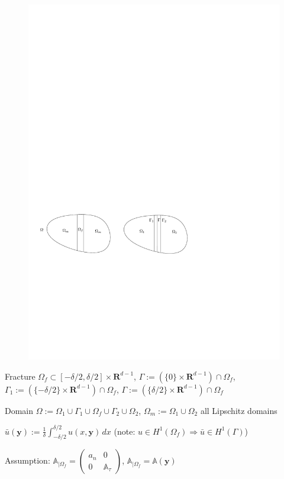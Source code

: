 \documentclass[a4paper]{article}
\def\vc#1{\mathbf{\boldsymbol{#1}}}     %
\def\tn#1{{\mathbb{#1}}}    %
\def\Real{{\mathbf R}}
\begin{document}
\begin{figure}[h]
\centering
\includegraphics[width=12cm]{figures/domains}
\end{figure}

Fracture $\Omega_f\subset[-\delta/2,\delta/2]\times\Real^{d-1}$, $\Gamma:=(\{0\}\times\Real^{d-1})\cap\Omega_f$, $\Gamma_1:=(\{-\delta/2\}\times\Real^{d-1})\cap\Omega_f$, $\Gamma:=(\{\delta/2\}\times\Real^{d-1})\cap\Omega_f$

Domain $\Omega:=\Omega_1\cup\Gamma_1\cup\Omega_f\cup\Gamma_2\cup\Omega_2$, $\Omega_m:=\Omega_1\cup\Omega_2$ all Lipschitz domains

$\bar u(\vc y) := \frac1\delta\int_{-\delta/2}^{\delta/2}u(x,\vc y)\,dx$
(note: $u\in H^1(\Omega_f)\Rightarrow\bar u\in H^1(\Gamma)$)

Assumption: $\tn A_{|\Omega_f} = \begin{pmatrix}a_n&0\\0&\tn A_\tau\end{pmatrix}$, $\tn A_{|\Omega_f}=\tn A(\vc y)$
\end{document}
